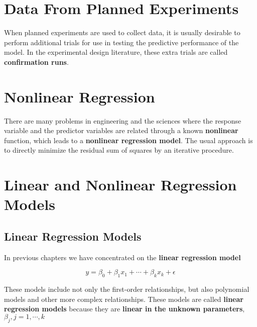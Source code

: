 \documentclass[12pt]{article}
\begin{document}
\section{Data From Planned Experiments}

When planned experiments are used to collect data, it is usually desirable to perform additional trials for use in testing the predictive performance of the model. In the experimental design literature, these extra trials are called \textbf{confirmation runs}. 





\pagebreak
\section*{Nonlinear Regression}
\setcounter{section}{0}
\bigskip


There are many problems in engineering and the sciences where the response variable and the predictor variables are related through a known \textbf{nonlinear} function, which leads to a \textbf{nonlinear regression model}. The usual approach is to directly minimize the residual sum of squares by an iterative procedure. 

\section{Linear and Nonlinear Regression Models}

\subsection{Linear Regression Models}

In previous chapters we have concentrated on the \textbf{linear regression model}

$$
y = \beta_0 + \beta_1 x_1 + \cdots + \beta_k x_k + \epsilon
$$

These models include not only the first-order relationships, but also polynomial models and other more complex relationships. These models are called \textbf{linear regression models} because they are \textbf{linear in the unknown parameters}, $\beta_j, j=1, \cdots, k$
\end{document}
